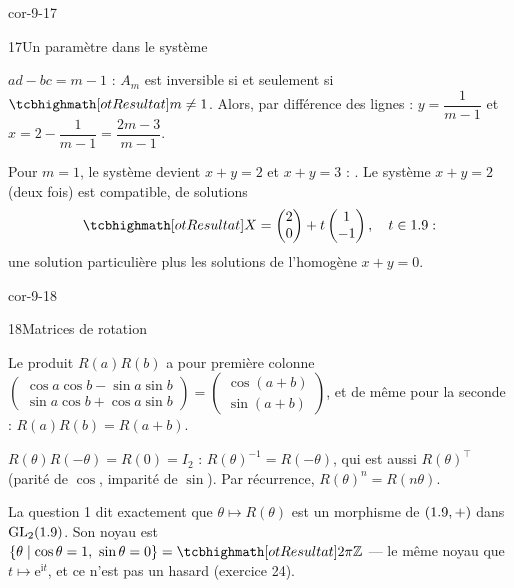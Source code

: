 \begin{blocLivre}{cor-9-17}
\begin{corrige}{17}{Un paramètre dans le système}
\begin{questions}
  \item $ad-bc=m-1$ : $A_m$ est inversible si et seulement si
    $\res{m\neq1}$. Alors, par différence des lignes :
    $y=\dfrac{1}{m-1}$ et $x=2-\dfrac{1}{m-1}=\dfrac{2m-3}{m-1}$.
  \item Pour $m=1$, le système devient $x+y=2$ et $x+y=3$ :
    . Le système $x+y=2$ (deux fois) est
    compatible, de solutions
    \[
      \res{X=\begin{pmatrix}2\\0\end{pmatrix}
      +t\begin{pmatrix}1\\-1\end{pmatrix},\quad t\in\R} :
    \]
    une solution particulière plus les solutions de l'homogène
    $x+y=0$.
\end{questions}
\end{corrige}
\end{blocLivre}

\begin{blocLivre}{cor-9-18}
\begin{corrige}{18}{Matrices de rotation}
\begin{questions}
  \item Le produit $R(a)R(b)$ a pour première colonne
    $\begin{pmatrix}\cos a\cos b-\sin a\sin b\\
    \sin a\cos b+\cos a\sin b\end{pmatrix}
    =\begin{pmatrix}\cos(a+b)\\\sin(a+b)\end{pmatrix}$, et de même pour la
    seconde : $R(a)R(b)=R(a+b)$.
  \item $R(\theta)R(-\theta)=R(0)=I_2$ :
    $R(\theta)^{-1}=R(-\theta)$, qui est aussi $R(\theta)^{\top}$
    (parité de $\cos$, imparité de $\sin$). Par récurrence,
    $R(\theta)^{n}=R(n\theta)$.
  \item La question 1 dit exactement que $\theta\mapsto R(\theta)$ est un
    morphisme de $(1.9,+)$ dans $\mathrm{GL}_2(1.9)$. Son noyau est
    $\ens{\theta \mid \cos\theta=1,\ \sin\theta=0}=\res{2\pi\Z}$ — le même
    noyau que $t\mapsto\mathrm{e}^{\mathrm{i}t}$, et ce n'est pas un
    hasard (exercice 24).
\end{questions}
\end{corrige}
\end{blocLivre}

